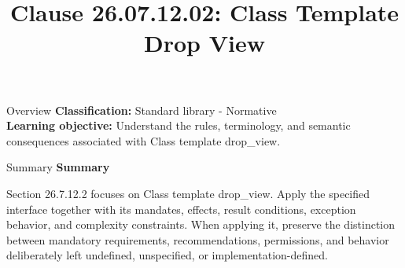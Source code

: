 \documentclass[10pt,letterpaper]{article}
\title{Clause 26.07.12.02: Class Template Drop View}
\author{}
\date{}
\begin{document}
\maketitle
\begin{CornellOverviewBox}{Overview}
\textbf{Classification:} Standard library - Normative\\[2pt]
\textbf{Learning objective:} Understand the rules, terminology, and semantic consequences associated with Class template drop\_view.
\end{CornellOverviewBox}\begin{CornellSummaryBox}{Summary}
{\sffamily\bfseries\color{Accent} Summary}\par\vspace{3pt}Section 26.7.12.2 focuses on Class template drop\_view. Apply the specified interface together with its mandates, effects, result conditions, exception behavior, and complexity constraints. When applying it, preserve the distinction between mandatory requirements, recommendations, permissions, and behavior deliberately left undefined, unspecified, or implementation-defined.
\end{CornellSummaryBox}
\end{document}
